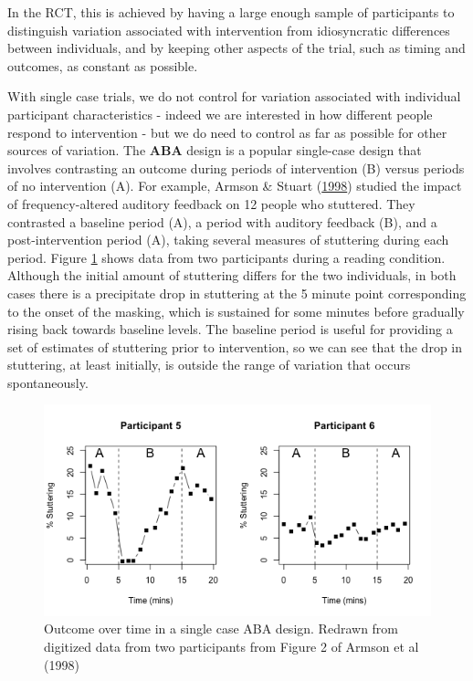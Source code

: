 \documentclass{krantz}
\begin{document}
In the RCT, this is achieved by having a large enough sample of participants to distinguish variation associated with intervention from idiosyncratic differences between individuals, and by keeping other aspects of the trial, such as timing and outcomes, as constant as possible.

With single case trials, we do not control for variation associated with individual participant characteristics - indeed we are interested in how different people respond to intervention - but we do need to control as far as possible for other sources of variation. The \textbf{ABA} design is a popular single-case design that involves contrasting an outcome during periods of intervention (B) versus periods of no intervention (A). For example, Armson \& Stuart (\protect\hyperlink{ref-armson1998}{1998}) studied the impact of frequency-altered auditory feedback on 12 people who stuttered. They contrasted a baseline period (A), a period with auditory feedback (B), and a post-intervention period (A), taking several measures of stuttering during each period. Figure \ref{fig:SingleCaseDplot} shows data from two participants during a reading condition. Although the initial amount of stuttering differs for the two individuals, in both cases there is a precipitate drop in stuttering at the 5 minute point corresponding to the onset of the masking, which is sustained for some minutes before gradually rising back towards baseline levels. The baseline period is useful for providing a set of estimates of stuttering prior to intervention, so we can see that the drop in stuttering, at least initially, is outside the range of variation that occurs spontaneously.

\begin{figure}
\includegraphics[width=0.85\linewidth]{images_bw/SingleCaseDplot} \caption{Outcome over time in a single case ABA design. Redrawn from digitized data from two participants from Figure 2 of Armson et al (1998)}\label{fig:SingleCaseDplot}
\end{figure}
\end{document}
